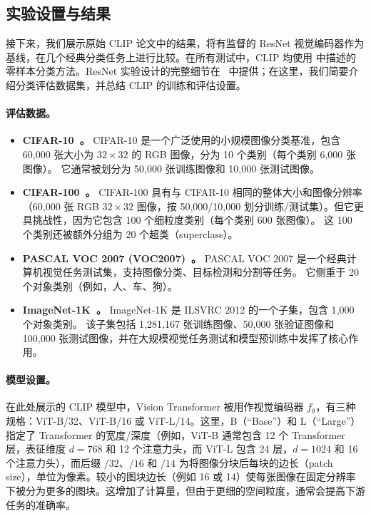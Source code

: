\documentclass[../../book-main_zh.tex]{subfiles}
\begin{document}
\subsection{实验设置与结果}

接下来，我们展示原始 CLIP 论文中的结果，将有监督的 ResNet 视觉编码器作为基线，在几个经典分类任务上进行比较。在所有测试中，CLIP 均使用  中描述的零样本分类方法。ResNet 实验设计的完整细节在~\citep{He2016-lc} 中提供；在这里，我们简要介绍分类评估数据集，并总结 CLIP 的训练和评估设置。

\paragraph{评估数据。}
\begin{itemize}
    \item \textbf{CIFAR-10~\citep{krizhevsky2009learning}。}
    CIFAR-10 是一个广泛使用的小规模图像分类基准，包含 60{,}000 张大小为 \(32\times 32\) 的 RGB 图像，分为 10 个类别（每个类别 6{,}000 张图像）。
    它通常被划分为 50{,}000 张训练图像和 10{,}000 张测试图像。

    \item \textbf{CIFAR-100~\citep{krizhevsky2009learning}。}
    CIFAR-100 具有与 CIFAR-10 相同的整体大小和图像分辨率（60{,}000 张 RGB \(32\times 32\) 图像，按 50{,}000/10{,}000 划分训练/测试集）。但它更具挑战性，因为它包含 100 个细粒度类别（每个类别 600 张图像）。
    这 100 个类别还被额外分组为 20 个超类（superclass）。

    \item \textbf{PASCAL VOC 2007 (VOC2007)~\citep{everingham2010pascal}。}
    PASCAL VOC 2007 是一个经典计算机视觉任务测试集，支持图像分类、目标检测和分割等任务。
    它侧重于 20 个对象类别（例如，人、车、狗）。

    \item \textbf{ImageNet-1K~\citep{imagenet_cvpr09}。}
    ImageNet-1K 是 ILSVRC 2012 的一个子集，包含 1{,}000 个对象类别。
    该子集包括 1{,}281{,}167 张训练图像、50{,}000 张验证图像和 100{,}000 张测试图像，并在大规模视觉任务测试和模型预训练中发挥了核心作用。
\end{itemize}

\paragraph{模型设置。}
在此处展示的 CLIP 模型中，Vision Transformer 被用作视觉编码器 \(f_{\theta}\)，有三种规格：ViT-B/32、ViT-B/16 或 ViT-L/14。这里，\(\text{B}\)（“Base”）和 \(\text{L}\)（“Large”）指定了 Transformer 的宽度/深度（例如，ViT-B 通常包含 12 个 Transformer 层，表征维度 \(d=768\) 和 12 个注意力头，而 ViT-L 包含 24 层，\(d=1024\) 和 16 个注意力头），而后缀 \(/32\)、\(/16\) 和 \(/14\) 为将图像分块后每块的边长（patch size），单位为像素。较小的图块边长（例如 16 或 14）使每张图像在固定分辨率下被分为更多的图块。这增加了计算量，但由于更细的空间粒度，通常会提高下游任务的准确率。
\end{document}
